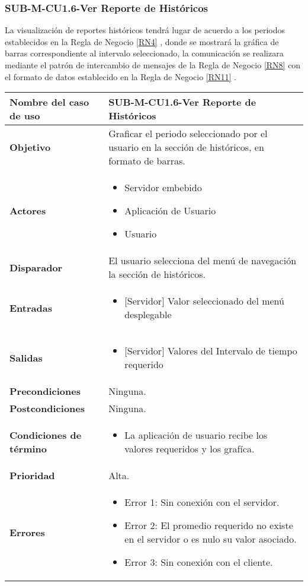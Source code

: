\subsubsection{SUB-M-CU1.6-Ver Reporte de Históricos}\label{SUB-M-CU1.6}
La visualización de reportes históricos tendrá lugar de acuerdo a los periodos establecidos en la Regla de Negocio \ref{RN4} , donde se mostrará la gráfica de barras correspondiente al  intervalo seleccionado, la comunicación se realizara mediante el patrón de intercambio de mensajes de la Regla de Negocio \ref{RN8} con el formato de datos establecido en la Regla de Negocio \ref{RN11} .

\begin{longtable}{|J{5cm}|J{10.3cm}|}
	\hline
	\textbf{Nombre del caso de uso} &
		SUB-M-CU1.6-Ver Reporte de Históricos \\ \hline
	\textbf{Objetivo} &
		Graficar el periodo seleccionado por el usuario en la sección de históricos, en formato de barras. \\ \hline
	\textbf{Actores} &
		\begin{itemize}
			\item Servidor embebido
			\item Aplicación de Usuario
			\item Usuario 
		\end{itemize} \\ \hline
	\textbf{Disparador} & 
		El usuario selecciona del menú de navegación la sección de históricos. \\ \hline 
	\textbf{Entradas} & 
		\begin{itemize}
			\item{[Servidor]} Valor seleccionado del menú desplegable
		\end{itemize}\\ \hline 
	\textbf{Salidas} & 
		\begin{itemize}
			\item{[Servidor]} Valores del Intervalo de tiempo requerido
		\end{itemize} \\ \hline
	\textbf{Precondiciones} &
		Ninguna.\\ \hline
	\textbf{Postcondiciones} &
		Ninguna.\\ \hline
	\textbf{Condiciones de término} & 
		\begin{itemize}
			\item La aplicación de usuario recibe los valores requeridos y los grafíca.
		\end{itemize} \\ \hline 
	\textbf{Prioridad} & 
		Alta. \\ \hline
	\textbf{Errores} & 
		\begin{itemize}
		    \item \label{CU5:Error1} Error 1: Sin conexión con el servidor.
			\item \label{CU5:Error2} Error 2: El promedio requerido no existe en el servidor o es nulo su valor asociado.
		    \item \label{CU5:Error3} Error 3: Sin conexión con el cliente.
			

\end{itemize}
\end{longtable}
